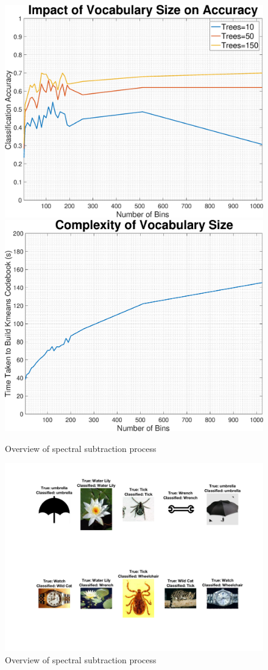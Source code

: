 \documentclass[a4paper,pra,twocolumn,10pt,aps,longbibliography,nobalancelastpage]{revtex4-1}
\begin{document}
\begin{figure}[H]
	\centering
    \includegraphics[width=0.49\columnwidth]{numBins_acc}
	\includegraphics[width=0.49\columnwidth]{numBins_complexity}
    \caption{Overview of spectral subtraction process}
\end{figure}

\begin{figure}[H]
	\centering
    \includegraphics[width=0.60\columnwidth]{images}
    \caption{Overview of spectral subtraction process}
\end{figure}
\end{document}
